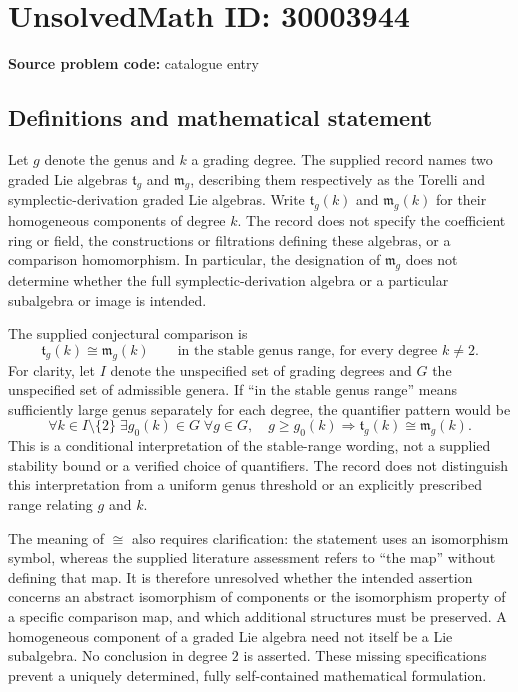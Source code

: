\documentclass[11pt]{article}
\begin{document}
\section*{UnsolvedMath ID: 30003944}
\textbf{Source problem code:} catalogue entry
\subsection{Definitions and mathematical statement}
Let \(g\) denote the genus and \(k\) a grading degree. The supplied record names two graded Lie algebras \(\mathfrak t_g\) and \(\mathfrak m_g\), describing them respectively as the Torelli and symplectic-derivation graded Lie algebras. Write \(\mathfrak t_g(k)\) and \(\mathfrak m_g(k)\) for their homogeneous components of degree \(k\). The record does not specify the coefficient ring or field, the constructions or filtrations defining these algebras, or a comparison homomorphism. In particular, the designation of \(\mathfrak m_g\) does not determine whether the full symplectic-derivation algebra or a particular subalgebra or image is intended.

The supplied conjectural comparison is
\[
\mathfrak t_g(k)\cong\mathfrak m_g(k)
\qquad\text{in the stable genus range, for every degree }k\ne 2.
\]
For clarity, let \(I\) denote the unspecified set of grading degrees and \(G\) the unspecified set of admissible genera. If ``in the stable genus range'' means sufficiently large genus separately for each degree, the quantifier pattern would be
\[
\forall k\in I\setminus\{2\}\;\exists g_0(k)\in G\;
\forall g\in G,\quad
 g\ge g_0(k)\Longrightarrow
 \mathfrak t_g(k)\cong\mathfrak m_g(k).
\]
This is a conditional interpretation of the stable-range wording, not a supplied stability bound or a verified choice of quantifiers. The record does not distinguish this interpretation from a uniform genus threshold or an explicitly prescribed range relating \(g\) and \(k\).

The meaning of \(\cong\) also requires clarification: the statement uses an isomorphism symbol, whereas the supplied literature assessment refers to ``the map'' without defining that map. It is therefore unresolved whether the intended assertion concerns an abstract isomorphism of components or the isomorphism property of a specific comparison map, and which additional structures must be preserved. A homogeneous component of a graded Lie algebra need not itself be a Lie subalgebra. No conclusion in degree \(2\) is asserted. These missing specifications prevent a uniquely determined, fully self-contained mathematical formulation.
\end{document}
